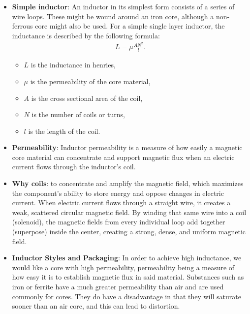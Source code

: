 \documentclass{report}
\begin{document}
\begin{itemize}
\begin{align*}
                W = \frac{1}{2}LI^{2}
            .\end{align*}
        \item \textbf{Simple inductor}: An inductor in its simplest form consists of a series of wire loops. These might be wound around an iron core, although a non-ferrous core might also be used. For a simple single layer inductor, the inductance is described by the following formula:
            \begin{align*}
                L = \mu \frac{AN^{2}}{l}
            .\end{align*}
            \begin{itemize}
                \item $L$ is the inductance in henries,
                \item $\mu$ is the permeability of the core material,
                \item $A$ is the cross sectional area of the coil,
                \item $N$ is the number of coils or turns,
                \item $l$ is the length of the coil.
            \end{itemize}
        \item \textbf{Permeability}: Inductor permeability is a measure of how easily a magnetic core material can concentrate and support magnetic flux when an electric current flows through the inductor's coil.
        \item \textbf{Why coils}: to concentrate and amplify the magnetic field, which maximizes the component's ability to store energy and oppose changes in electric current.
            \bigbreak \noindent 
            When electric current flows through a straight wire, it creates a weak, scattered circular magnetic field. By winding that same wire into a coil (solenoid), the magnetic fields from every individual loop add together (superpose) inside the center, creating a strong, dense, and uniform magnetic field.
        \item \textbf{Inductor Styles and Packaging}: In order to achieve high inductance, we would like a core with high permeability, permeability being a measure of how easy it is to establish magnetic flux in said material. Substances such as iron or ferrite have a much greater permeability than air and are used commonly for cores. They do have a disadvantage in that they will saturate sooner than an air core, and this can lead to distortion. 
            \bigbreak \noindent 

\end{itemize}
\end{document}
